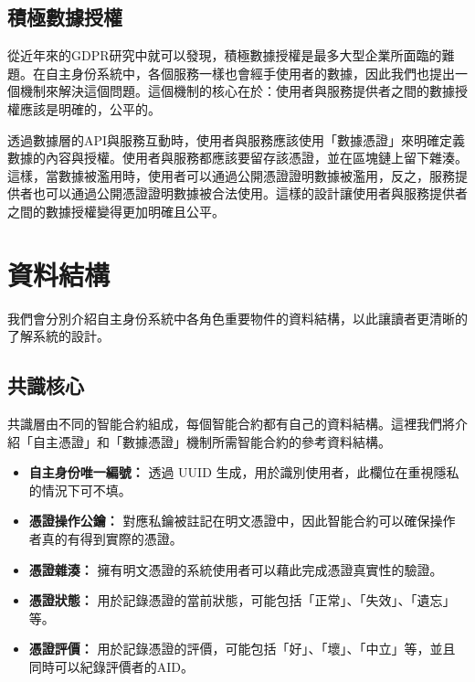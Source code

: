\subsection{積極數據授權}
從近年來的GDPR研究中就可以發現，積極數據授權是最多大型企業所面臨的難題。在自主身份系統中，各個服務一樣也會經手使用者的數據，因此我們也提出一個機制來解決這個問題。這個機制的核心在於：使用者與服務提供者之間的數據授權應該是明確的，公平的。

透過數據層的API與服務互動時，使用者與服務應該使用「數據憑證」來明確定義數據的內容與授權。使用者與服務都應該要留存該憑證，並在區塊鏈上留下雜湊。這樣，當數據被濫用時，使用者可以通過公開憑證證明數據被濫用，反之，服務提供者也可以通過公開憑證證明數據被合法使用。這樣的設計讓使用者與服務提供者之間的數據授權變得更加明確且公平。
\section{資料結構}
我們會分別介紹自主身份系統中各角色重要物件的資料結構，以此讓讀者更清晰的了解系統的設計。
\subsection{共識核心}
共識層由不同的智能合約組成，每個智能合約都有自己的資料結構。這裡我們將介紹「自主憑證」和「數據憑證」機制所需智能合約的參考資料結構。
\begin{itemize}
  \item \textbf{自主身份唯一編號：} 透過 UUID 生成，用於識別使用者，此欄位在重視隱私的情況下可不填。
  \item \textbf{憑證操作公鑰：} 對應私鑰被註記在明文憑證中，因此智能合約可以確保操作者真的有得到實際的憑證。
  \item \textbf{憑證雜湊：} 擁有明文憑證的系統使用者可以藉此完成憑證真實性的驗證。
  \item \textbf{憑證狀態：} 用於記錄憑證的當前狀態，可能包括「正常」、「失效」、「遺忘」等。
  \item \textbf{憑證評價：} 用於記錄憑證的評價，可能包括「好」、「壞」、「中立」等，並且同時可以紀錄評價者的AID。
\end{itemize}
